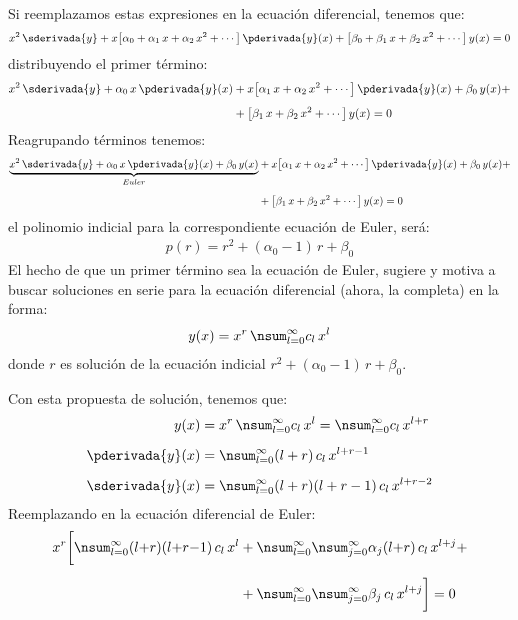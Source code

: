 Si reemplazamos estas expresiones en la ecuación diferencial, tenemos que:
\begin{align*}
x^{2} \, \sderivada{y} + x \big[ \alpha_{0} + \alpha_{1} \, x + \alpha_{2} \, x^{2} + \cdots \big] \, \pderivada{y} (x) + \big[ \beta_{0} + \beta_{1} \, x + \beta_{2} \, x^{2} + \cdots \big] \, y (x) = 0
\end{align*}
distribuyendo el primer término:
\begin{align*}
x^{2} \, \sderivada{y} + \alpha_{0} \, x \, \pderivada{y} (x) &+ x \big[ \alpha_{1} \, x + \alpha_{2} \, x^{2} + \cdots \big] \, \pderivada{y} (x) + \beta_{0} \, y (x) + \\[0.5em]
&+ \big[ \beta_{1} \, x + \beta_{2} \, x^{2} + \cdots \big] \, y (x) = 0
\end{align*}
Reagrupando términos tenemos:
\begin{align*}
\underbrace{x^{2} \, \sderivada{y} + \alpha_{0} \, x \, \pderivada{y} (x) + \beta_{0} \, y (x)}_{Euler} &+ x \big[ \alpha_{1} \, x + \alpha_{2} \, x^{2} + \cdots \big] \, \pderivada{y} (x) + \beta_{0} \, y (x) + \\[0.5em]
&+ \big[ \beta_{1} \, x + \beta_{2} \, x^{2} + \cdots \big] \, y (x) = 0
\end{align*}
el polinomio indicial para la correspondiente ecuación de Euler, será:
\begin{align*}
p (r) = r^{2} + (\alpha_{0} - 1) \, r + \beta_{0}
\end{align*}
El hecho de que un primer término sea la ecuación de Euler, sugiere y motiva a buscar soluciones en serie para la ecuación diferencial (ahora, la completa) en la forma:
\begin{align}
y (x) = x^{r} \, \nsum_{l=0}^{\infty} c_{l} \, x^{l}
\label{eq:ecuacion_16}
\end{align}
donde $r$ es solución de la ecuación indicial $r^{2} + (\alpha_{0} - 1) \, r + \beta_{0}$.
\par
Con esta propuesta de solución, tenemos que:
\begin{align*}
y (x) &= x^{r} \, \nsum_{l=0}^{\infty} c_{l} \, x^{l} = \nsum_{l=0}^{\infty} c_{l} \, x^{l+r} \\[0.5em]
\pderivada{y} (x) &= \nsum_{l=0}^{\infty} (l + r) \, c_{l} \, x^{l+r-1} \\[0.5em]
\sderivada{y} (x) &= \nsum_{l=0}^{\infty} (l + r)(l + r - 1) \, c_{l} \, x^{l+r-2}
\end{align*}
Reemplazando en la ecuación diferencial de Euler:
\begin{align*}
x^{r} \bigg[ \nsum_{l=0}^{\infty} (l {+} r)(l {+} r {-} 1) \, c_{l} \, x^{l} &+ \nsum_{l=0}^{\infty} \nsum_{j=0}^{\infty} \alpha_{j} (l {+} r) \, c_{l} \, x^{l+j} + \\[0.5em]
&+ \nsum_{l=0}^{\infty} \nsum_{j=0}^{\infty} \beta_{j} \, c_{l} \, x^{l+j} \bigg] = 0
\end{align*}
